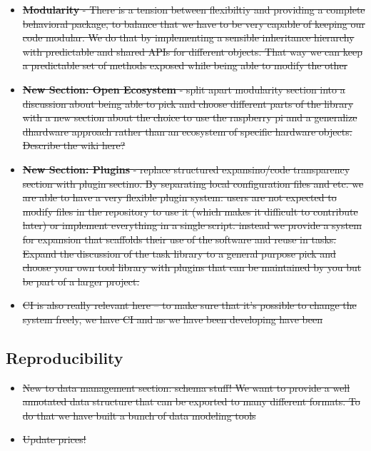 \begin{itemize}
\item \sout{\textbf{Modularity} - There is a tension between flexibiltiy and providing a complete behavioral package, to balance that we have to be very capable of keeping our code modular. We do that by implementing a sensible inheritance hierarchy with predictable and shared APIs for different objects. That way we can keep a predictable set of methods exposed while being able to modify the other}
\item \sout{\textbf{New Section: Open Ecosystem} - split apart modularity section into a discussion about being able to pick and choose different parts of the library with a new section about the choice to use the raspberry pi and a generalize dhardware approach rather than an ecosystem of specific hardware objects. Describe the wiki here?}
\item \sout{\textbf{New Section: Plugins} - replace structured expansino/code transparency section with plugin sectino. By separating local configuration files and etc. we are able to have a very flexible plugin system: users are not expected to modify files in the repository to use it (which makes it difficult to contribute later) or implement everything in a single script. instead we provide a system for expansion that scaffolds their use of the software and reuse in tasks. Expand the discussion of the task library to a general purpose pick and choose your own tool library with plugins that can be maintained by you but be part of a larger project.}
\item \sout{CI is also really relevant here -- to make sure that it's possible to change the system freely, we have CI and as we have been developing have been}

\end{itemize}

\subsection{Reproducibility}

\begin{itemize}
\item \sout{New to data management section: schema stuff! We want to provide a well annotated data structure that can be exported to many different formats. To do that we have built a bunch of data modeling tools}

\item \sout{Update prices!}
\end{itemize}

